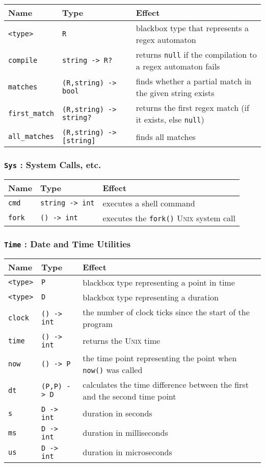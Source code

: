 \documentclass{article}
\newcommand{\code}[1]{\lstinline[columns=fixed]{#1}}
\begin{document}
				\begin{longtable}{l|l|l}
					\textbf{Name} & \textbf{Type} & \textbf{Effect} \\
					\midrule
					\code{<type>} & \code{R} & blackbox type that represents a regex automaton \\
					\code{compile} & \code{string -> R?} & returns \code{null} if the compilation to a regex automaton fails \\
					\code{matches} & \code{(R,string) -> bool} & finds whether a partial match in the given string exists \\
					\code{first_match} & \code{(R,string) -> string?} & returns the first regex match (if it exists, else \code{null}) \\
					\code{all_matches} & \code{(R,string) -> [string]} & finds all matches
				\end{longtable}
			
			\subsubsection{\code{Sys} : System Calls, etc.}
			
				\begin{longtable}{l|l|l}
					\textbf{Name} & \textbf{Type} & \textbf{Effect} \\
					\midrule
					\code{cmd} & \code{string -> int} & executes a shell command \\
					\code{fork} & \code{() -> int} & executes the \code{fork()} \textsc{Unix} system call
				\end{longtable}
			
			\subsubsection{\code{Time} : Date and Time Utilities}
			
				\begin{longtable}{l|l|l}
					\textbf{Name} & \textbf{Type} & \textbf{Effect} \\
					\midrule
					\code{<type>} & \code{P} & blackbox type representing a point in time \\
					\code{<type>} & \code{D} & blackbox type representing a duration \\
					\code{clock} & \code{() -> int} & the number of clock ticks since the start of the program \\
					\code{time} & \code{() -> int} & returns the \textsc{Unix} time \\
					\code{now} & \code{() -> P} & the time point representing the point when \code{now()} was called \\
					\code{dt} & \code{(P,P) -> D} & calculates the time difference between the first and the second time point \\
					\code{s} & \code{D -> int} & duration in seconds \\
					\code{ms} & \code{D -> int} & duration in milliseconds \\
					\code{us} & \code{D -> int} & duration in microseconds
				\end{longtable}
		
\end{document}
